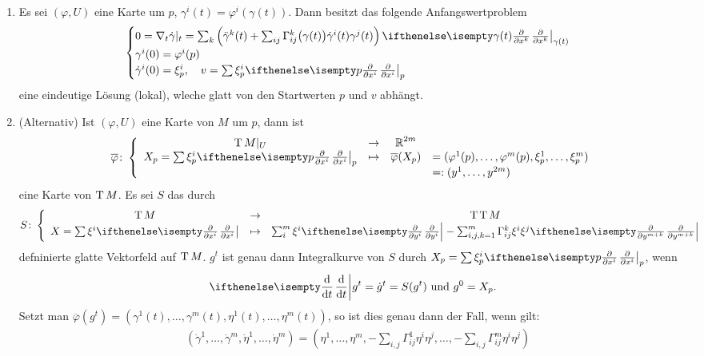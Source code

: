 \begin{bew}\begin{enumerate}[label=(\Alph*),leftmargin=*,widest=B]
\item
	Es sei $(\varphi, U)$ eine Karte um $p$, $\gamma^i(t) = \varphi^i(\gamma(t))$. Dann besitzt das folgende Anfangswertproblem
	\begin{align*}
		\begin{cases}
			0 = \nabla_t\dot \gamma|_t = \sum_k\left(\ddot \gamma^k(t) + \sum_{ij}\Gamma_{ij}^k\big(\gamma(t)\big)\dot \gamma^i(t)\gamma^j(t)\right) \pdifffrac[\gamma(t)]{}{x^k}\\
			\gamma^i(0) = \varphi^i(p)\\
			\dot\gamma^i(0) = \xi_p^i, \quad v = \sum \xi^i_p\pdifffrac[p]{}{x^i}
		\end{cases}
	\end{align*}
	eine eindeutige Lösung (lokal), wleche glatt von den Startwerten $p$ und $v$ abhängt.
\item
	(Alternativ) Ist $(\varphi, U)$ eine Karte von $M$ um $p$, dann ist
	\[ \overline \varphi \colon \left\{\begin{array}{cccl}
		\T M|_U &\to& \R^{2m}&\\
		X_p=\sum \xi_p^i\pdifffrac[p]{}{x^i} &\mapsto& \overline\varphi(X_p) &= (\varphi^1(p), \ldots, \varphi^m(p), \xi_p^1, \ldots, \xi_p^m)\\
		&&& =: (y^1, \ldots, y^{2m})
	\end{array}\right.\]
	eine Karte von $\operatorname{T} M$.	
	Es sei $S$ das durch
	\[ S \colon \left\{ \begin{array}{ccc}
		\T M &\to& \T\T M\\
		X = \sum \xi^i \pdifffrac{}{x^i} &\mapsto& \sum_i^m \xi^i \pdifffrac{}{y^i} - \sum_{i,j,k=1}^{m} \Gamma_{ij}^k \xi^i\xi^j\pdifffrac{}{y^{m+k}}
	\end{array}\right.\]
	defninierte glatte Vektorfeld auf $\operatorname{T} M$.	
	$g^t$ ist genau dann Integralkurve von $S$ durch $X_p = \sum \xi_p^i\pdifffrac[p]{}{x^i}$, wenn
	\begin{align*}
		\difffrac{}{t}g^t = \dot g^t = S(g^t) \text{ und } g^0 = X_p.
	\end{align*}
	Setzt man $\overline \varphi(g^t) = (\gamma^1(t), \ldots, \gamma^m(t),\eta^1(t), \ldots, \eta^m(t))$, so ist dies genau dann der Fall, wenn gilt:
	\begin{align*}
		& (\dot\gamma^1,\ldots, \dot\gamma^m,\dot\eta^1,\ldots, \dot\eta^m) = \left(\eta^1, \ldots, \eta^m, -\sum_{i,j}\Gamma_{ij}^1\eta^i\eta^j, \ldots, -\sum_{i,j}\Gamma_{ij}^m\eta^i\eta^j\right)\\

\end{align*}
\end{enumerate}
\end{bew}

